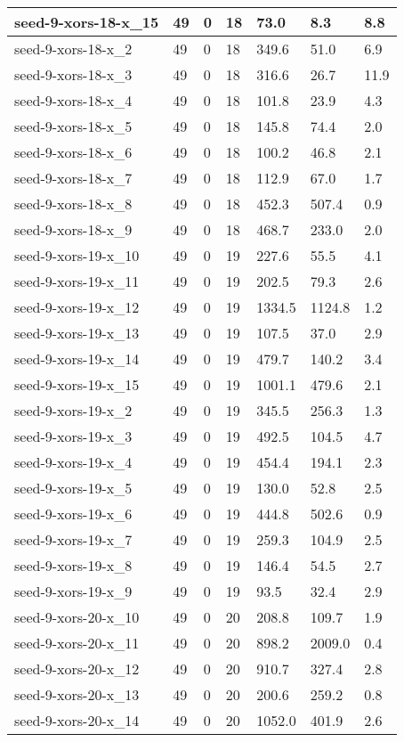 \begin{scriptsize}
\begin{longtable}{|p{5cm}|l|l|l|l|l|l|}
seed-9-xors-18-x\_15&49&0&18&73.0&8.3&8.8 \\ \hline 
seed-9-xors-18-x\_2&49&0&18&349.6&51.0&6.9 \\ \hline 
seed-9-xors-18-x\_3&49&0&18&316.6&26.7&11.9 \\ \hline 
seed-9-xors-18-x\_4&49&0&18&101.8&23.9&4.3 \\ \hline 
seed-9-xors-18-x\_5&49&0&18&145.8&74.4&2.0 \\ \hline 
seed-9-xors-18-x\_6&49&0&18&100.2&46.8&2.1 \\ \hline 
seed-9-xors-18-x\_7&49&0&18&112.9&67.0&1.7 \\ \hline 
seed-9-xors-18-x\_8&49&0&18&452.3&507.4&0.9 \\ \hline 
seed-9-xors-18-x\_9&49&0&18&468.7&233.0&2.0 \\ \hline 
seed-9-xors-19-x\_10&49&0&19&227.6&55.5&4.1 \\ \hline 
seed-9-xors-19-x\_11&49&0&19&202.5&79.3&2.6 \\ \hline 
seed-9-xors-19-x\_12&49&0&19&1334.5&1124.8&1.2 \\ \hline 
seed-9-xors-19-x\_13&49&0&19&107.5&37.0&2.9 \\ \hline 
seed-9-xors-19-x\_14&49&0&19&479.7&140.2&3.4 \\ \hline 
seed-9-xors-19-x\_15&49&0&19&1001.1&479.6&2.1 \\ \hline 
seed-9-xors-19-x\_2&49&0&19&345.5&256.3&1.3 \\ \hline 
seed-9-xors-19-x\_3&49&0&19&492.5&104.5&4.7 \\ \hline 
seed-9-xors-19-x\_4&49&0&19&454.4&194.1&2.3 \\ \hline 
seed-9-xors-19-x\_5&49&0&19&130.0&52.8&2.5 \\ \hline 
seed-9-xors-19-x\_6&49&0&19&444.8&502.6&0.9 \\ \hline 
seed-9-xors-19-x\_7&49&0&19&259.3&104.9&2.5 \\ \hline 
seed-9-xors-19-x\_8&49&0&19&146.4&54.5&2.7 \\ \hline 
seed-9-xors-19-x\_9&49&0&19&93.5&32.4&2.9 \\ \hline 
seed-9-xors-20-x\_10&49&0&20&208.8&109.7&1.9 \\ \hline 
seed-9-xors-20-x\_11&49&0&20&898.2&2009.0&0.4 \\ \hline 
seed-9-xors-20-x\_12&49&0&20&910.7&327.4&2.8 \\ \hline 
seed-9-xors-20-x\_13&49&0&20&200.6&259.2&0.8 \\ \hline 
seed-9-xors-20-x\_14&49&0&20&1052.0&401.9&2.6 \\ \hline 

\end{longtable}
\end{scriptsize}

